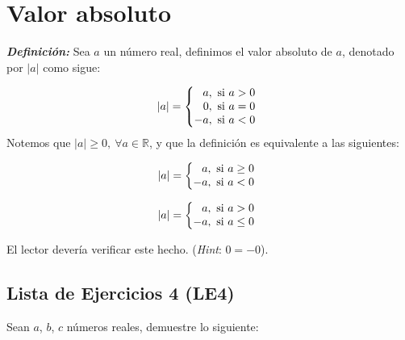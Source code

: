 \documentclass[11pt]{article}
\newcommand{\R}{\mathbb{R}}
\newcommand{\bfit}[1]{\textbf{\textit{#1}}}
\begin{document}
\section*{Valor absoluto}

\bfit{Definición:}  Sea $a$ un número real, definimos el valor absoluto de $a$, denotado por $|a|$ como sigue:

 \[
  |a| = \left\{
 \begin{array}{@{}r@{\thinspace}l}
  a, &  \ \text{si}  \ a>0\\
  0, &  \ \text{si}  \ a=0\\
  -a, & \  \text{si} \  a<0
 \end{array} \right. \]
Notemos que $|a|\geq 0, \ \forall a\in \R$, y que la definición es equivalente a las siguientes:

\begin{center}
\begin{minipage}[c]{.3\linewidth}
 \[|a| = \left\{
  \begin{array}{@{}r@{\thinspace}l}
   a, & \ \text{si} \ a\geq 0\\
   -a, & \ \text{si} \ a<0
  \end{array} \right.\]
 \end{minipage}%
\begin{minipage}[c]{.3\linewidth}
 \[|a| = \left\{
  \begin{array}{@{}r@{\thinspace}l}
   a, & \ \text{si} \ a>0\\
   -a, & \ \text{si} \ a\leq 0
  \end{array} \right.\]
\end{minipage}
\end{center}

El lector devería verificar este hecho. (\textit{Hint}: $0=-0$).

\subsection*{Lista de Ejercicios 4 (LE4)}

Sean $a$, $b$, $c$ números reales, demuestre lo siguiente:
\end{document}
